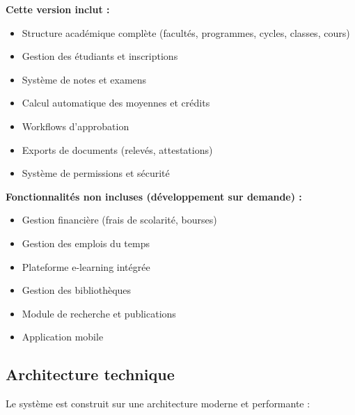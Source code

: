 \begin{tcolorbox}[colback=blue!5!white,colframe=blue!75!black,title=Version 1.0 - Fonctionnalités de base]

\textbf{Cette version inclut :}
\begin{itemize}[leftmargin=*]
    \item Structure académique complète (facultés, programmes, cycles, classes, cours)
    \item Gestion des étudiants et inscriptions
    \item Système de notes et examens
    \item Calcul automatique des moyennes et crédits
    \item Workflows d'approbation
    \item Exports de documents (relevés, attestations)
    \item Système de permissions et sécurité
\end{itemize}

\textbf{Fonctionnalités non incluses (développement sur demande) :}
\begin{itemize}[leftmargin=*]
    \item Gestion financière (frais de scolarité, bourses)
    \item Gestion des emplois du temps
    \item Plateforme e-learning intégrée
    \item Gestion des bibliothèques
    \item Module de recherche et publications
    \item Application mobile
\end{itemize}

\end{tcolorbox}

\subsection{Architecture technique}

Le système est construit sur une architecture moderne et performante :

